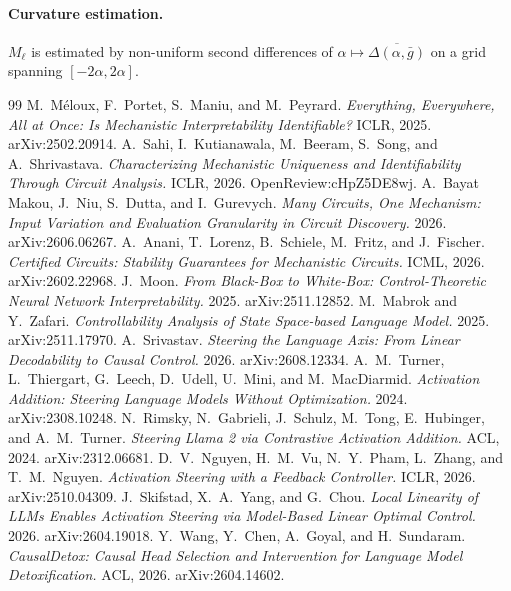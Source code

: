 \documentclass[11pt]{article}
\theoremstyle{definition}
\theoremstyle{remark}
\newcommand{\gbar}{\bar{g}}
\begin{document}
\paragraph{Curvature estimation.} $M_\ell$ is estimated by non-uniform second
differences of $\alpha\mapsto\overline{\Delta(\alpha,\gbar)}$ on a grid spanning
$[-2\alpha,2\alpha]$.

\begin{thebibliography}{99}
\small
{}
M.~Méloux, F.~Portet, S.~Maniu, and M.~Peyrard. \emph{Everything, Everywhere,
All at Once: Is Mechanistic Interpretability Identifiable?} ICLR, 2025.
arXiv:2502.20914.
A.~Sahi, I.~Kutianawala, M.~Beeram, S.~Song, and A.~Shrivastava.
\emph{Characterizing Mechanistic Uniqueness and Identifiability Through
Circuit Analysis.} ICLR, 2026. OpenReview:cHpZ5DE8wj.
A.~Bayat Makou, J.~Niu, S.~Dutta, and I.~Gurevych. \emph{Many Circuits, One
Mechanism: Input Variation and Evaluation Granularity in Circuit Discovery.}
2026. arXiv:2606.06267.
A.~Anani, T.~Lorenz, B.~Schiele, M.~Fritz, and J.~Fischer. \emph{Certified
Circuits: Stability Guarantees for Mechanistic Circuits.} ICML, 2026.
arXiv:2602.22968.
J.~Moon. \emph{From Black-Box to White-Box: Control-Theoretic Neural Network
Interpretability.} 2025. arXiv:2511.12852.
M.~Mabrok and Y.~Zafari. \emph{Controllability Analysis of State Space-based
Language Model.} 2025. arXiv:2511.17970.
A.~Srivastav. \emph{Steering the Language Axis: From Linear Decodability to
Causal Control.} 2026. arXiv:2608.12334.
A.~M.~Turner, L.~Thiergart, G.~Leech, D.~Udell, U.~Mini, and M.~MacDiarmid.
\emph{Activation Addition: Steering Language Models Without Optimization.}
2024. arXiv:2308.10248.
N.~Rimsky, N.~Gabrieli, J.~Schulz, M.~Tong, E.~Hubinger, and A.~M.~Turner.
\emph{Steering Llama 2 via Contrastive Activation Addition.} ACL, 2024.
arXiv:2312.06681.
D.~V.~Nguyen, H.~M.~Vu, N.~Y.~Pham, L.~Zhang, and T.~M.~Nguyen.
\emph{Activation Steering with a Feedback Controller.} ICLR, 2026.
arXiv:2510.04309.
J.~Skifstad, X.~A.~Yang, and G.~Chou. \emph{Local Linearity of LLMs Enables
Activation Steering via Model-Based Linear Optimal Control.} 2026.
arXiv:2604.19018.
Y.~Wang, Y.~Chen, A.~Goyal, and H.~Sundaram. \emph{CausalDetox: Causal Head
Selection and Intervention for Language Model Detoxification.} ACL, 2026.
arXiv:2604.14602.

\end{thebibliography}
\end{document}

